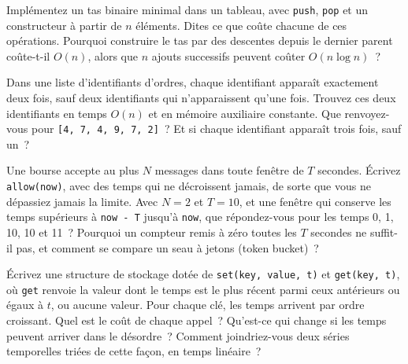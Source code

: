 \begin{question}\label{iq:iv3:algorithms:40}
Implémentez un tas binaire minimal dans un tableau, avec \texttt{push}, \texttt{pop} et un constructeur à partir de $n$ éléments. Dites ce que coûte chacune de ces opérations. Pourquoi construire le tas par des descentes depuis le dernier parent coûte-t-il $O(n)$, alors que $n$ ajouts successifs peuvent coûter $O(n \log n)$~?
\end{question}

\begin{question}\label{iq:iv3:algorithms:41}
Dans une liste d'identifiants d'ordres, chaque identifiant apparaît exactement deux fois, sauf deux identifiants qui n'apparaissent qu'une fois. Trouvez ces deux identifiants en temps $O(n)$ et en mémoire auxiliaire constante. Que renvoyez-vous pour \texttt{[4, 7, 4, 9, 7, 2]}~? Et si chaque identifiant apparaît trois fois, sauf un~?
\end{question}

\begin{question}\label{iq:iv3:algorithms:42}
Une bourse accepte au plus $N$ messages dans toute fenêtre de $T$ secondes. Écrivez \texttt{allow(now)}, avec des temps qui ne décroissent jamais, de sorte que vous ne dépassiez jamais la limite. Avec $N = 2$ et $T = 10$, et une fenêtre qui conserve les temps supérieurs à \texttt{now - T} jusqu'à \texttt{now}, que répondez-vous pour les temps 0, 1, 10, 10 et 11~? Pourquoi un compteur remis à zéro toutes les $T$ secondes ne suffit-il pas, et comment se compare un seau à jetons (token bucket)~?
\end{question}

\begin{question}\label{iq:iv3:algorithms:43}
Écrivez une structure de stockage dotée de \texttt{set(key, value, t)} et \texttt{get(key, t)}, où \texttt{get} renvoie la valeur dont le temps est le plus récent parmi ceux antérieurs ou égaux à $t$, ou aucune valeur. Pour chaque clé, les temps arrivent par ordre croissant. Quel est le coût de chaque appel~? Qu'est-ce qui change si les temps peuvent arriver dans le désordre~? Comment joindriez-vous deux séries temporelles triées de cette façon, en temps linéaire~?
\end{question}


